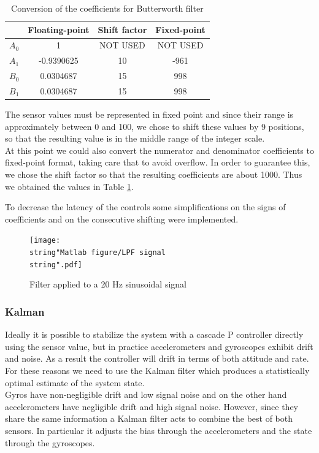 \documentclass[11pt]{article}
\begin{document}
\begin{table}[ht]
\centering
\begin{tabular}{|c|c|c|c|}
\hline 
 & Floating-point & Shift factor & Fixed-point\tabularnewline
\hline 
$A_{0}$ & 1 & NOT USED & NOT USED\tabularnewline
\hline 
$A_{1}$ & -0.9390625 & 10 & -961\tabularnewline
\hline 
$B_{0}$ & 0.0304687 & 15 & 998\tabularnewline
\hline 
$B_{1}$ & 0.0304687 & 15 & 998\tabularnewline
\hline
\end{tabular}
\caption{Conversion of the coefficients for Butterworth filter}
\label{lpfcoeff}
\end{table}



The sensor values must be represented in fixed point
and since their range is approximately between 0 and 100, we
chose to shift these values by 9 positions, so that the resulting
value is in the middle range of the integer scale.\\
At this point we could also convert the numerator and denominator
coefficients to fixed-point format, taking care that to avoid
overflow. In order to guarantee this, we chose the shift factor so
that the resulting coefficients are about 1000. Thus we obtained the values in Table \ref{lpfcoeff}.

To decrease the latency of the controls some simplifications
on the signs of coefficients and on the consecutive shifting were implemented.

%
\begin{figure}[ht]
\centering
\texttt{[image: \\string"Matlab figure/LPF signal\\string".pdf]}
\caption{Filter applied to a 20 Hz sinusoidal signal }
\label{filteredsignal}

\end{figure}



\subsubsection{Kalman}

Ideally it is possible to stabilize the system with a cascade
P controller directly using the sensor value, but in practice
accelerometers and gyroscopes exhibit drift and noise. As a result
the controller will drift in terms of both attitude and rate. For
these reasons we need to use the Kalman filter which produces a statistically
optimal estimate of the system state.\\
Gyros have non-negligible drift and low signal noise and on the
other hand accelerometers have negligible drift and high signal noise.
However, since they share the same information a Kalman filter acts to combine
the best of both sensors. In particular it adjusts the
bias through the accelerometers and the state through the gyroscopes.
\end{document}

